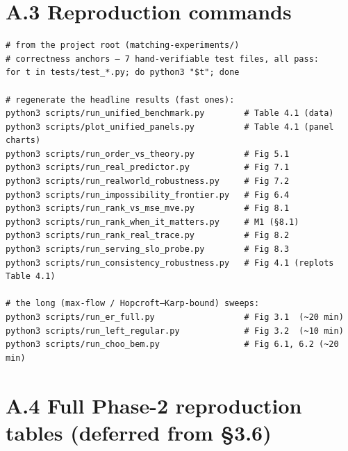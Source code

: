 \section{A.3 Reproduction commands}\label{a.3-reproduction-commands}

\begin{verbatim}
# from the project root (matching-experiments/)
# correctness anchors — 7 hand-verifiable test files, all pass:
for t in tests/test_*.py; do python3 "$t"; done

# regenerate the headline results (fast ones):
python3 scripts/run_unified_benchmark.py        # Table 4.1 (data)
python3 scripts/plot_unified_panels.py          # Table 4.1 (panel charts)
python3 scripts/run_order_vs_theory.py          # Fig 5.1
python3 scripts/run_real_predictor.py           # Fig 7.1
python3 scripts/run_realworld_robustness.py     # Fig 7.2
python3 scripts/run_impossibility_frontier.py   # Fig 6.4
python3 scripts/run_rank_vs_mse_mve.py          # Fig 8.1
python3 scripts/run_rank_when_it_matters.py     # M1 (§8.1)
python3 scripts/run_rank_real_trace.py          # Fig 8.2
python3 scripts/run_serving_slo_probe.py        # Fig 8.3
python3 scripts/run_consistency_robustness.py   # Fig 4.1 (replots Table 4.1)

# the long (max-flow / Hopcroft–Karp-bound) sweeps:
python3 scripts/run_er_full.py                  # Fig 3.1  (~20 min)
python3 scripts/run_left_regular.py             # Fig 3.2  (~10 min)
python3 scripts/run_choo_bem.py                 # Fig 6.1, 6.2 (~20 min)
\end{verbatim}


\section{A.4 Full Phase-2 reproduction tables (deferred from
§3.6)}\label{a.4-full-phase-2-reproduction-tables-deferred-from-3.6}

